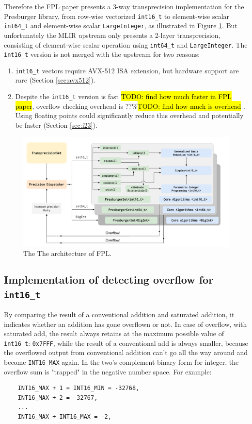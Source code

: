 \documentclass[logo,bsc,singlespacing,parskip]{infthesis}
\newenvironment{compactlist}
{ \begin{enumerate}
    \setlength{\itemsep}{0pt}
    \setlength{\parskip}{0pt}
    \setlength{\parsep}{0pt}     
}
{ \end{enumerate} }
\begin{document}
Therefore the FPL paper presents a 3-way transprecision implementation for the
Presburger library, from row-wise vectorized \texttt{int16\_t} to element-wise
scalar \texttt{int64\_t} and element-wise scalar \texttt{LargeInteger}, as
illustrated in Figure \ref{fig:fpl_arch}. But unfortunately the MLIR upstream
only presents a 2-layer transprecision, consisting of element-wise scalar
operation using \texttt{int64\_t} and \texttt{LargeInteger}. The
\texttt{int16\_t} version is not merged with the upstream for two reasons: 
\begin{compactlist} 
    \item \texttt{int16\_t} vectors require AVX-512 ISA extension, but hardware
    support are rare (Section \ref{sec:avx512}). 
    \item Despite the \texttt{int16\_t} version is fast \hl{TODO: find how much
    faster in FPL paper}, overflow checking overhead is ??\%\hl{TODO: find how
    much is overhead} \cite{FPL2}. Using floating points could significantly
    reduce this overhead and potentially be faster (Section \ref{sec:i23}).  
\end{compactlist}


\begin{figure}
    \includegraphics[width=\linewidth]{image/transprecision.png}
    \caption{The The architecture of FPL.}
    \label{fig:fpl_arch}
\end{figure}

\subsection{Implementation of detecting overflow for \texttt{int16\_t} }

By comparing the result of a conventional addition and saturated addition, it
indicates whether an addition has gone overflown or not. In case of overflow,
with saturated add, the result always retains at the maximum possible value of
\texttt{int16\_t}: \texttt{0x7FFF}, while the result of a conventional add is
always smaller, because the overflowed output from conventional addition
can't go all the way around and become \texttt{INT16\_MAX} again. In the two's
complement binary form for integer, the overflow sum is "trapped" in the
negative number space. For example: 
\begin{verbatim}
    INT16_MAX + 1 = INT16_MIN = -32768, 
    INT16_MAX + 2 = -32767, 
    ...
    INT16_MAX + INT16_MAX = -2, 
\end{verbatim}
\end{document}
